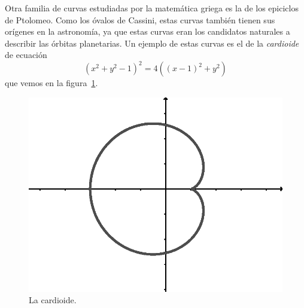 Otra familia de curvas estudiadas por la matemática griega es la de los
epiciclos de Ptolomeo. Como los óvalos de Cassini, estas curvas también tienen sus orígenes en la
astronomía, ya que estas curvas eran los candidatos naturales a describir las órbitas
planetarias. Un ejemplo de estas curvas es el de la \emph{cardioide} de ecuación
\[
	(x^2+y^2-1)^2=4( (x-1)^2+y^2)
\]
que vemos en la figura~\ref{fig:cardioide}.

\begin{figure}
   \centering
   \includegraphics[scale=0.5]{images/cardioid}
   \caption{La cardioide.}
   \label{fig:cardioide}
\end{figure}
 
